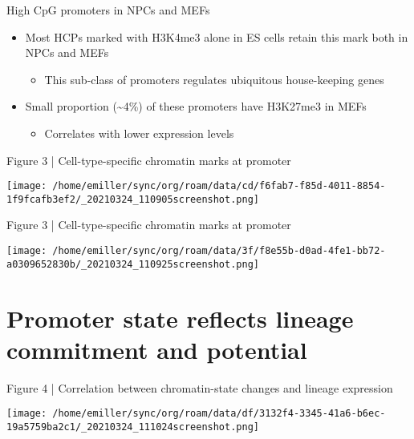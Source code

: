 \documentclass[bigger]{beamer}
\begin{document}
\begin{frame}[label={sec:org342f446}]{High CpG promoters in NPCs and MEFs}
\begin{itemize}
\item Most HCPs marked with H3K4me3 alone in ES cells retain this mark both in NPCs
and MEFs
\begin{itemize}
\item This sub-class of promoters regulates ubiquitous house-keeping genes
\end{itemize}
\item Small proportion (\textasciitilde{}4\%) of these promoters have H3K27me3 in MEFs
\begin{itemize}
\item Correlates with lower expression levels
\end{itemize}
\end{itemize}
\end{frame}

\begin{frame}[label={sec:org32f0b8b}]{Figure 3 | Cell-type-specific chromatin marks at promoter}
\begin{center}
\texttt{[image: /home/emiller/sync/org/roam/data/cd/f6fab7-f85d-4011-8854-1f9fcafb3ef2/\_20210324\_110905screenshot.png]}
\end{center}
\end{frame}


\begin{frame}[label={sec:org71a6e95}]{Figure 3 | Cell-type-specific chromatin marks at promoter}
\begin{center}
\texttt{[image: /home/emiller/sync/org/roam/data/3f/f8e55b-d0ad-4fe1-bb72-a0309652830b/\_20210324\_110925screenshot.png]}
\end{center}
\end{frame}


\section{Promoter state reflects lineage commitment and potential}
\label{sec:org535562a}

\begin{frame}[label={sec:org1fbbdd2}]{Figure 4 | Correlation between chromatin-state changes and lineage expression}
\begin{center}
\texttt{[image: /home/emiller/sync/org/roam/data/df/3132f4-3345-41a6-b6ec-19a5759ba2c1/\_20210324\_111024screenshot.png]}
\end{center}
\end{frame}
\end{document}
